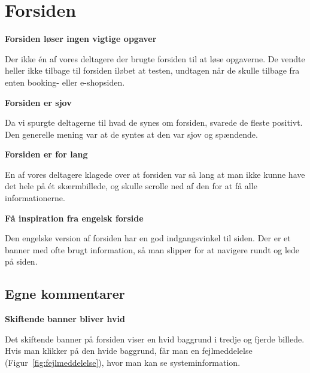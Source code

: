 \documentclass[10pt,a4paper]{article}      %
\newcommand\pic[1]{\texttt{[image: Pics/\#1]}}
\renewcommand\good{\pic{good}}
\renewcommand\goodidea{\pic{goodidea}}
\renewcommand\smallproblem{\pic{smallproblem}}
\renewcommand\seriousproblem{\pic{seriousproblem}}
\begin{document}
\section{Forsiden}

\begin{kommentarer}
\item[\seriousproblem]{\textbf{Forsiden løser ingen vigtige opgaver}}

Der ikke én af vores deltagere der brugte forsiden til at løse opgaverne. De
vendte heller ikke tilbage til forsiden iløbet at testen, undtagen når de skulle
tilbage fra enten booking- eller e-shopsiden.

\item[\good]{\textbf{Forsiden er sjov}}

Da vi spurgte deltagerne til hvad de synes om forsiden, svarede de fleste
positivt. Den generelle mening var at de syntes at den var sjov og spændende.

\item[\smallproblem]{\textbf{Forsiden er for lang}}

En af vores deltagere klagede over at forsiden var så lang at man ikke kunne
have det hele på ét skærmbillede, og skulle scrolle ned af den for at få alle
informationerne.

\item[\goodidea]{\textbf{Få inspiration fra engelsk forside}}

Den engelske version af forsiden har en god indgangsvinkel til siden. Der er et
banner med ofte brugt information, så man slipper for at navigere rundt og lede
på siden.
\end{kommentarer}

\subsection{Egne kommentarer}

\begin{kommentarer}
  \item[\seriousproblem]{\textbf{Skiftende banner bliver hvid}}

  Det skiftende banner på forsiden viser en hvid baggrund i tredje og fjerde
  billede. Hvis man klikker på den hvide baggrund, får man en fejlmeddelelse (Figur~\ref{fig:fejlmeddelelse}), hvor man kan se systeminformation.
\end{kommentarer}
\end{document}
